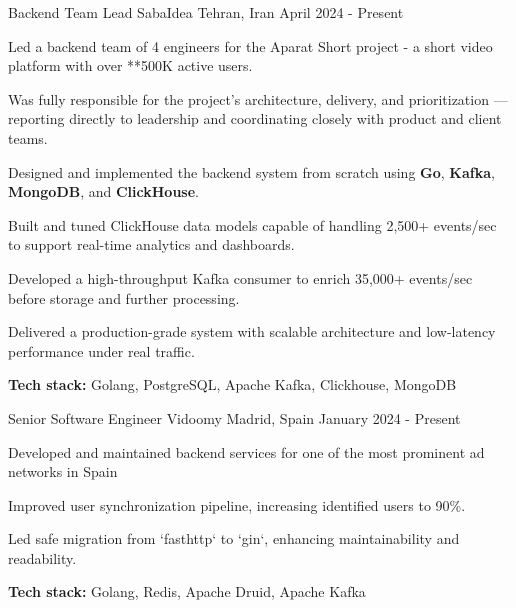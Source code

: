 

\begin{cventries}


  \cventry
    {Backend Team Lead} %
    {SabaIdea} %
    {Tehran, Iran} %
    {April 2024 - Present} %
    {
      \begin{cvitems} %
        \item Led a backend team of 4 engineers for the Aparat Short project - a short video platform with over **500K active users.
        \item Was fully responsible for the project’s architecture, delivery, and prioritization — reporting directly to leadership and coordinating closely with product and client teams.
        \item Designed and implemented the backend system from scratch using \textbf{Go}, \textbf{Kafka}, \textbf{MongoDB}, and \textbf{ClickHouse}.
        \item Built and tuned ClickHouse data models capable of handling 2,500+ events/sec to support real-time analytics and dashboards.
        \item Developed a high-throughput Kafka consumer to enrich 35,000+ events/sec before storage and further processing.
        \item Delivered a production-grade system with scalable architecture and low-latency performance under real traffic.
        \item \textbf{Tech stack:} Golang, PostgreSQL, Apache Kafka, Clickhouse, MongoDB
      \end{cvitems}
    }

    
  \cventry
    {Senior Software Engineer} %
    {Vidoomy} %
    {Madrid, Spain} %
    {January 2024 - Present} %
    {
      \begin{cvitems} %
        \item Developed and maintained backend services for one of the most prominent ad networks in Spain
        \item Improved user synchronization pipeline, increasing identified users to 90\%.
        \item Led safe migration from `fasthttp` to `gin`, enhancing maintainability and readability.
        \item \textbf{Tech stack:} Golang, Redis, Apache Druid, Apache Kafka
      \end{cvitems}
    }


\end{cventries}
